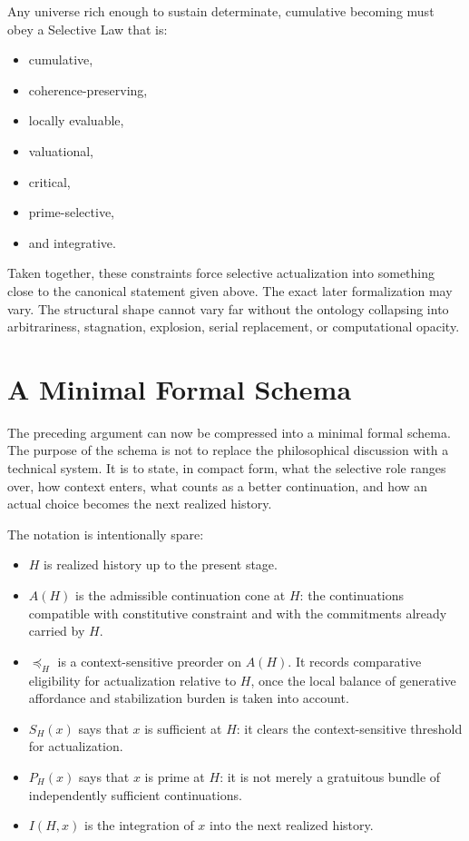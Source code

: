 \documentclass[11pt]{article}
\theoremstyle{foundation}
\begin{document}
Any universe rich enough to sustain determinate, cumulative becoming must obey a Selective Law that is:

\begin{itemize}
    \item cumulative,
    \item coherence-preserving,
    \item locally evaluable,
    \item valuational,
    \item critical,
    \item prime-selective,
    \item and integrative.
\end{itemize}

Taken together, these constraints force selective actualization into something close to the canonical statement given above. The exact later formalization may vary. The structural shape cannot vary far without the ontology collapsing into arbitrariness, stagnation, explosion, serial replacement, or computational opacity.

\section{A Minimal Formal Schema}

The preceding argument can now be compressed into a minimal formal schema. The purpose of the schema is not to replace the philosophical discussion with a technical system. It is to state, in compact form, what the selective role ranges over, how context enters, what counts as a better continuation, and how an actual choice becomes the next realized history.

The notation is intentionally spare:

\begin{itemize}
    \item $H$ is realized history up to the present stage.
    \item $A(H)$ is the admissible continuation cone at $H$: the continuations compatible with constitutive constraint and with the commitments already carried by $H$.
    \item $\preceq_H$ is a context-sensitive preorder on $A(H)$. It records comparative eligibility for actualization relative to $H$, once the local balance of generative affordance and stabilization burden is taken into account.
    \item $S_H(x)$ says that $x$ is sufficient at $H$: it clears the context-sensitive threshold for actualization.
    \item $P_H(x)$ says that $x$ is prime at $H$: it is not merely a gratuitous bundle of independently sufficient continuations.
    \item $I(H,x)$ is the integration of $x$ into the next realized history.
\end{itemize}
\end{document}
